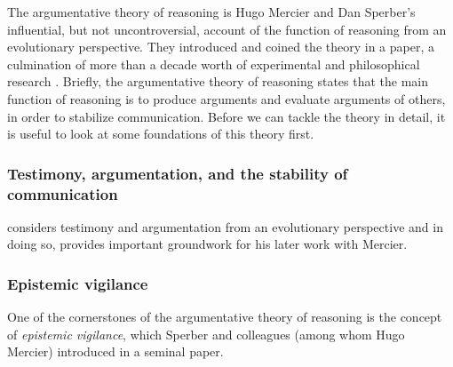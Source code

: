 The argumentative theory of reasoning is Hugo Mercier and Dan Sperber's influential, but not uncontroversial, account of the function of reasoning from an evolutionary perspective. They introduced and coined the theory in a \citeyear{MS11} paper, a culmination of more than a decade worth of experimental and philosophical research \citep{Sperber01, Sperber10, Mercier09, Sperber00}.
Briefly, the argumentative theory of reasoning states that the main function of reasoning is to produce arguments and evaluate arguments of others, in order to stabilize communication.
Before we can tackle the theory in detail, it is useful to look at some foundations of this theory first.

\subsubsection{Testimony, argumentation, and the stability of communication}

\citet{Sperber01} considers testimony and argumentation from an evolutionary perspective and in doing so, provides important groundwork for his later work with Mercier.


\subsubsection{Epistemic vigilance}


One of the cornerstones of the argumentative theory of reasoning is the concept of \emph{epistemic vigilance}, which Sperber and colleagues (among whom Hugo Mercier) introduced in a seminal \citeyear{Sperber10} paper.

